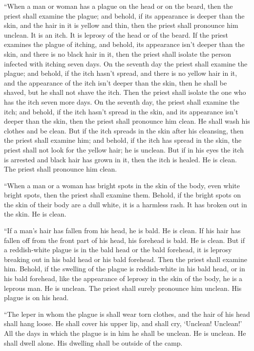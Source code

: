 \myverse{}“When a man or woman has a plague on the head or on the beard,
\myverse{}then the priest shall examine the plague; and behold, if its appearance is
deeper than the skin, and the hair in it is yellow and thin, then the priest shall pronounce him unclean.
It is an itch. It is leprosy of the head or of the beard.
\myverse{}If the priest examines the plague of itching, and behold, its appearance
isn’t deeper than the skin, and there is no black hair in it, then the priest shall isolate the person
infected with itching seven days.
\myverse{}On the seventh day the priest shall examine the plague; and behold, if the
itch hasn’t spread, and there is no yellow hair in it, and the appearance of the itch isn’t deeper than
the skin,
\myverse{}then he shall be shaved, but he shall not shave the itch. Then the priest
shall isolate the one who has the itch seven more days.
\myverse{}On the seventh day, the priest shall examine the itch; and behold, if the
itch hasn’t spread in the skin, and its appearance isn’t deeper than the skin, then the priest shall pronounce
him clean. He shall wash his clothes and be clean.
\myverse{}But if the itch spreads in the skin after his cleansing,
\myverse{}then the priest shall examine him; and behold, if the itch has spread in
the skin, the priest shall not look for the yellow hair; he is unclean.
\myverse{}But if in his eyes the itch is arrested and black hair has grown in it, then
the itch is healed. He is clean. The priest shall pronounce him clean.


\myverse{}“When a man or a woman has bright spots in the skin of the body,
even white bright spots,
\myverse{}then the priest shall examine them. Behold, if the bright spots on the skin
of their body are a dull white, it is a harmless rash. It has broken out in the skin. He is clean.


\myverse{}“If a man’s hair has fallen from his head, he is bald. He is
clean.
\myverse{}If his hair has fallen off from the front part of his head, his forehead
is bald. He is clean.
\myverse{}But if a reddish-white plague is in the bald head or the bald forehead, it
is leprosy breaking out in his bald head or his bald forehead.
\myverse{}Then the priest shall examine him. Behold, if the swelling of the plague
is reddish-white in his bald head, or in his bald forehead, like the appearance of leprosy in the skin
of the body,
\myverse{}he is a leprous man. He is unclean. The priest shall surely pronounce him
unclean. His plague is on his head.


\myverse{}“The leper in whom the plague is shall wear torn clothes, and
the hair of his head shall hang loose. He shall cover his upper lip, and shall cry, ‘Unclean! Unclean!’
\myverse{}All the days in which the plague is in him he shall be unclean. He is unclean.
He shall dwell alone. His dwelling shall be outside of the camp.


